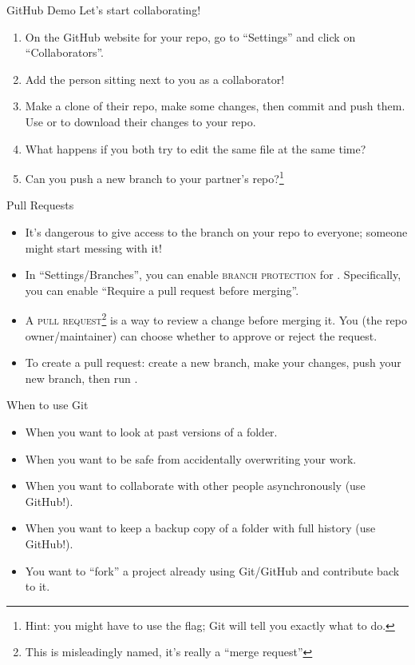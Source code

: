 \begin{frame}{GitHub Demo}
  Let's start collaborating!

  \begin{enumerate}
    \item On the GitHub website for your repo, go to \enquote{Settings} and
      click on \enquote{Collaborators}.
    \item Add the person sitting next to you as a collaborator!
    \item Make a clone of their repo, make some changes, then commit and push
      them.  Use  or  to download their changes to
      your repo.
    \item What happens if you both try to edit the same file at the same time?
    \item Can you push a new branch to your partner's repo?\footnote{Hint: you
      might have to use the  flag; Git will tell you
    exactly what to do.}
  \end{enumerate}
\end{frame}

\begin{frame}{Pull Requests}
  \begin{itemize}
    \item It's dangerous to give access to the  branch on your repo
      to everyone; someone might start messing with it!
    \item In \enquote{Settings/Branches}, you can enable \textsc{branch
      protection} for .  Specifically, you can enable
      \enquote{Require a pull request before merging}.
    \item A \textsc{pull request}\footnote{This is misleadingly named, it's
      really a \enquote{merge request}} is a way to review a change before
      merging it.  You (the repo owner/maintainer) can choose whether to
      approve or reject the request.
    \item To create a pull request: create a new branch, make your changes,
      push your new branch, then run .
  \end{itemize}
\end{frame}

\begin{frame}{When to use Git}
  \begin{itemize}
    \item When you want to look at past versions of a folder.

    \item When you want to be safe from accidentally overwriting your work.

    \item When you want to collaborate with other people asynchronously (use
      GitHub!).

    \item When you want to keep a backup copy of a folder with full history
      (use GitHub!).

    \item You want to \enquote{fork} a project already using Git/GitHub and
      contribute back to it.
  \end{itemize}
\end{frame}

